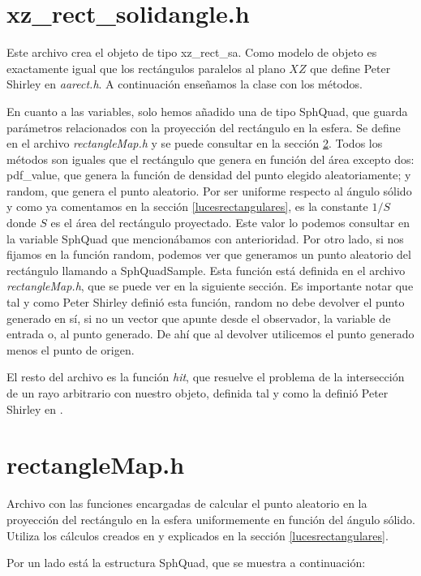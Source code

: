 \documentclass{scrbook}
\begin{document}
\section{xz\_rect\_solidangle.h}
\label{xz}
Este archivo crea el objeto de tipo xz\_rect\_sa. Como modelo de objeto es exactamente igual que los rectángulos paralelos al plano $XZ$ que define Peter Shirley en \textit{aarect.h}. A continuación enseñamos la clase con los métodos.

En cuanto a las variables, solo hemos añadido una de tipo SphQuad, que guarda parámetros relacionados con la proyección del rectángulo en la esfera. Se define en el archivo \textit{rectangleMap.h} y se puede consultar en la sección \ref{rectangleMap}. Todos los métodos son iguales que el rectángulo que genera en función del área excepto dos: pdf\_value, que genera la función de densidad del punto elegido aleatoriamente; y random, que genera el punto aleatorio. Por ser uniforme respecto al ángulo sólido y como ya comentamos en la sección \ref{lucesrectangulares}, es la constante $1/S$ donde $S$ es el área del rectángulo proyectado. Este valor lo podemos consultar en la variable SphQuad que mencionábamos con anterioridad. Por otro lado, si nos fijamos en la función random, podemos ver que generamos un punto aleatorio del rectángulo llamando a SphQuadSample. Esta función está definida en el archivo \textit{rectangleMap.h}, que se puede ver en la siguiente sección. Es importante notar que tal y como Peter Shirley definió esta función, random no debe devolver el punto generado en sí, si no un vector que apunte desde el observador, la variable de entrada o, al punto generado. De ahí que al devolver utilicemos el punto generado menos el punto de origen. 

El resto del archivo es la función \textit{hit}, que resuelve el problema de la intersección de un rayo arbitrario con nuestro objeto, definida tal y como la definió Peter Shirley en \cite{RestOfYourLife}.
\section{rectangleMap.h}
\label{rectangleMap}
Archivo con las funciones encargadas de calcular el punto aleatorio en la proyección del rectángulo en la esfera uniformemente en función del ángulo sólido. Utiliza los cálculos creados en \cite{ur2013} y explicados en la sección \ref{lucesrectangulares}. 

Por un lado está la estructura SphQuad, que se muestra a continuación:

\end{document}
